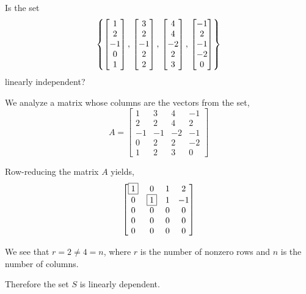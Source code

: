 \documentclass{ximera}
\author{Robert Beezer}
\begin{document}
\begin{exercise}
  Is the set 
  \[
    \left\{
      \begin{bmatrix}1\\2\\-1\\0\\1\end{bmatrix},\,
      \begin{bmatrix}3\\2\\-1\\2\\2\end{bmatrix},\,
      \begin{bmatrix}4\\4\\-2\\2\\3\end{bmatrix},\,
      \begin{bmatrix}-1\\2\\-1\\-2\\0\end{bmatrix}
    \right\}
  \]
  linearly independent?

  \begin{hint}
    We analyze a matrix whose columns are the vectors from the set,
    \[
      A=\begin{bmatrix}
        1 & 3 & 4 & -1\\
        2 & 2 & 4 & 2\\
        -1 & -1 & -2 & -1\\
        0 & 2 & 2 & -2\\
        1 & 2 & 3 & 0
      \end{bmatrix}
    \]
  \end{hint}
  
  \begin{hint}
    Row-reducing the matrix $A$ yields,
    \[
      \begin{bmatrix}
        \fbox{1} & 0 & 1 & 2\\
        0 & \fbox{1} & 1 & -1\\
        0 & 0 & 0 & 0\\
        0 & 0 & 0 & 0\\
        0 & 0 & 0 & 0
      \end{bmatrix}
    \]
  \end{hint}
  
  \begin{hint}
    We see that $r=2\neq 4=n$, where $r$ is the number of nonzero rows and $n$ is the number of columns.
  \end{hint}

  \begin{hint}
    Therefore the set $S$ is  linearly dependent.
  \end{hint}
    
  \begin{multipleChoice}
  \end{multipleChoice}

\end{exercise}
\end{document}
